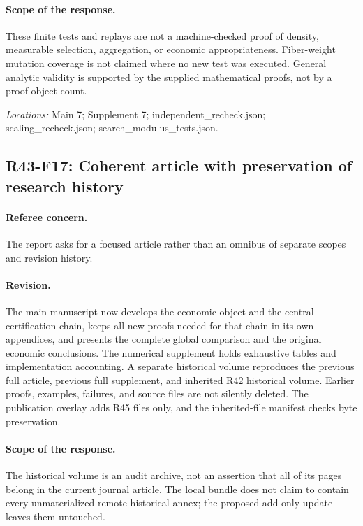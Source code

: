 \paragraph*{Scope of the response.} These finite tests and replays are not a machine-checked proof of density, measurable selection, aggregation, or economic appropriateness. Fiber-weight mutation coverage is not claimed where no new test was executed. General analytic validity is supported by the supplied mathematical proofs, not by a proof-object count.

\noindent\textit{Locations:} Main 7; Supplement 7; independent\_recheck.json; scaling\_recheck.json; search\_modulus\_tests.json.

\subsection{R43-F17: Coherent article with preservation of research history}
\paragraph*{Referee concern.} The report asks for a focused article rather than an omnibus of separate scopes and revision history.

\paragraph*{Revision.} The main manuscript now develops the economic object and the central certification chain, keeps all new proofs needed for that chain in its own appendices, and presents the complete global comparison and the original economic conclusions. The numerical supplement holds exhaustive tables and implementation accounting. A separate historical volume reproduces the previous full article, previous full supplement, and inherited R42 historical volume. Earlier proofs, examples, failures, and source files are not silently deleted. The publication overlay adds R45 files only, and the inherited-file manifest checks byte preservation.

\paragraph*{Scope of the response.} The historical volume is an audit archive, not an assertion that all of its pages belong in the current journal article. The local bundle does not claim to contain every unmaterialized remote historical annex; the proposed add-only update leaves them untouched.

